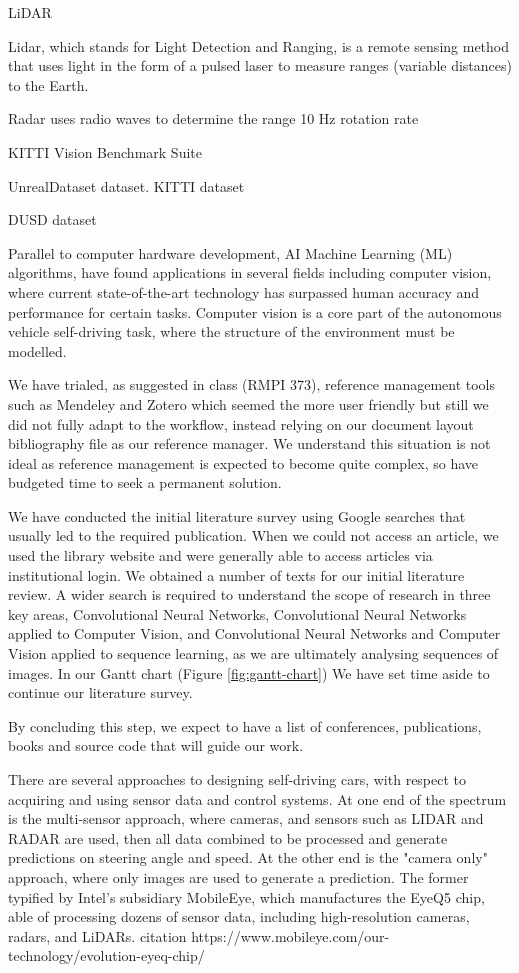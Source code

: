 LiDAR

Lidar, which stands for Light Detection and Ranging, is a remote sensing method that uses light in the form of a pulsed laser to measure ranges (variable distances) to the Earth.

Radar uses radio waves to determine the range
10 Hz rotation rate



KITTI Vision Benchmark Suite

UnrealDataset dataset.
KITTI dataset



DUSD dataset

Parallel to computer hardware development, AI Machine Learning (ML) algorithms, have found applications in several fields including computer vision, where current state-of-the-art technology has surpassed human accuracy and performance for certain tasks.
Computer vision is a core part of the autonomous vehicle self-driving task, where the structure of the environment must be modelled.


We have trialed, as suggested in class (RMPI 373), reference management tools such as Mendeley and Zotero which seemed the more user friendly but still we did not fully adapt to the workflow, instead relying on our document layout bibliography file as our reference manager. We understand this situation is not ideal as reference management is expected to become quite complex, so have budgeted time to seek a permanent solution.  

We have conducted the initial literature survey using Google searches that usually led to the required publication. When we could not access an article, we used the library website and were generally able to access articles via institutional login. We obtained a number of texts for our initial literature review. A wider search is required to understand the scope of research in three key areas, Convolutional Neural Networks, Convolutional Neural Networks applied to Computer Vision, and Convolutional Neural Networks and Computer Vision applied to sequence learning, as we are ultimately analysing sequences of images. In our Gantt chart (Figure \ref{fig:gantt-chart}) We have set time aside to continue our literature survey.  

By concluding this step, we expect to have a list of conferences, publications, books and source code that will guide our work.

There are several approaches to designing self-driving cars, with respect to acquiring and using sensor data and control systems. At one end of the spectrum is the multi-sensor approach, where cameras, and sensors such as LIDAR and RADAR are used, then all data combined to be processed and generate predictions on steering angle and speed. At the other end is the "camera only" approach, where only images are used to generate a prediction. The former typified by Intel's subsidiary MobileEye, which manufactures the EyeQ5 chip, able of processing dozens of sensor data, including high-resolution cameras, radars, and LiDARs.
citation
https://www.mobileye.com/our-technology/evolution-eyeq-chip/

